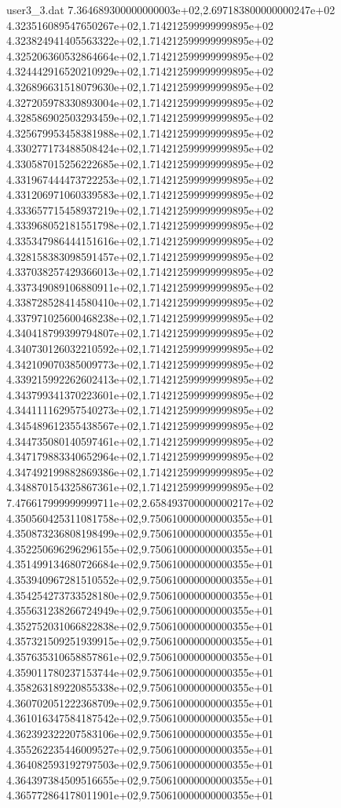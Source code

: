\begin{filecontents}{user3_3.dat}
7.364689300000000003e+02,2.697183800000000247e+02
4.323516089547650267e+02,1.714212599999999895e+02
4.323824941405563322e+02,1.714212599999999895e+02
4.325206360532864664e+02,1.714212599999999895e+02
4.324442916520210929e+02,1.714212599999999895e+02
4.326896631518079630e+02,1.714212599999999895e+02
4.327205978330893004e+02,1.714212599999999895e+02
4.328586902503293459e+02,1.714212599999999895e+02
4.325679953458381988e+02,1.714212599999999895e+02
4.330277173488508424e+02,1.714212599999999895e+02
4.330587015256222685e+02,1.714212599999999895e+02
4.331967444473722253e+02,1.714212599999999895e+02
4.331206971060339583e+02,1.714212599999999895e+02
4.333657715458937219e+02,1.714212599999999895e+02
4.333968052181551798e+02,1.714212599999999895e+02
4.335347986444151616e+02,1.714212599999999895e+02
4.328158383098591457e+02,1.714212599999999895e+02
4.337038257429366013e+02,1.714212599999999895e+02
4.337349089106880911e+02,1.714212599999999895e+02
4.338728528414580410e+02,1.714212599999999895e+02
4.337971025600468238e+02,1.714212599999999895e+02
4.340418799399794807e+02,1.714212599999999895e+02
4.340730126032210592e+02,1.714212599999999895e+02
4.342109070385009773e+02,1.714212599999999895e+02
4.339215992262602413e+02,1.714212599999999895e+02
4.343799341370223601e+02,1.714212599999999895e+02
4.344111162957540273e+02,1.714212599999999895e+02
4.345489612355438567e+02,1.714212599999999895e+02
4.344735080140597461e+02,1.714212599999999895e+02
4.347179883340652964e+02,1.714212599999999895e+02
4.347492199882869386e+02,1.714212599999999895e+02
4.348870154325867361e+02,1.714212599999999895e+02
7.476617999999999711e+02,2.658493700000000217e+02
4.350560425311081758e+02,9.750610000000000355e+01
4.350873236808198499e+02,9.750610000000000355e+01
4.352250696296296155e+02,9.750610000000000355e+01
4.351499134680726684e+02,9.750610000000000355e+01
4.353940967281510552e+02,9.750610000000000355e+01
4.354254273733528180e+02,9.750610000000000355e+01
4.355631238266724949e+02,9.750610000000000355e+01
4.352752031066822838e+02,9.750610000000000355e+01
4.357321509251939915e+02,9.750610000000000355e+01
4.357635310658857861e+02,9.750610000000000355e+01
4.359011780237153744e+02,9.750610000000000355e+01
4.358263189220855338e+02,9.750610000000000355e+01
4.360702051222368709e+02,9.750610000000000355e+01
4.361016347584187542e+02,9.750610000000000355e+01
4.362392322207583106e+02,9.750610000000000355e+01
4.355262235446009527e+02,9.750610000000000355e+01
4.364082593192797503e+02,9.750610000000000355e+01
4.364397384509516655e+02,9.750610000000000355e+01
4.365772864178011901e+02,9.750610000000000355e+01

\end{filecontents}
